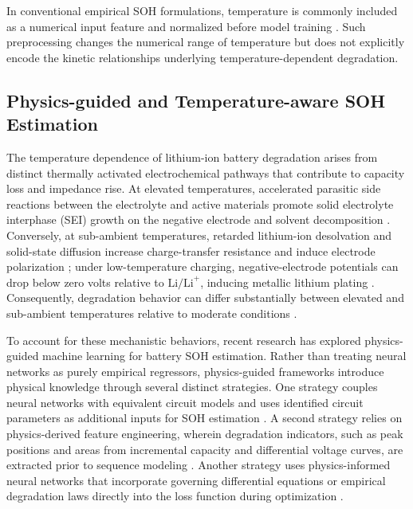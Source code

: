 \documentclass[a4paper,fleqn]{cas-sc}
\begin{document}
In conventional empirical SOH formulations, temperature is commonly included as a numerical input feature and normalized before model training \citep{sohtec2024,liu2025multi}. Such preprocessing changes the numerical range of temperature but does not explicitly encode the kinetic relationships underlying temperature-dependent degradation.

\subsection{Physics-guided and Temperature-aware SOH Estimation}\label{sec:rw-physics}
The temperature dependence of lithium-ion battery degradation arises from distinct thermally activated electrochemical pathways that contribute to capacity loss and impedance rise. At elevated temperatures, accelerated parasitic side reactions between the electrolyte and active materials promote solid electrolyte interphase (SEI) growth on the negative electrode and solvent decomposition \citep{gao2023effect}. Conversely, at sub-ambient temperatures, retarded lithium-ion desolvation and solid-state diffusion increase charge-transfer resistance and induce electrode polarization \citep{yang2018understanding}; under low-temperature charging, negative-electrode potentials can drop below zero volts relative to $\mathrm{Li/Li}^+$, inducing metallic lithium plating \citep{kumar2024}. Consequently, degradation behavior can differ substantially between elevated and sub-ambient temperatures relative to moderate conditions \citep{waldmann2014temperature}.

To account for these mechanistic behaviors, recent research has explored physics-guided machine learning for battery SOH estimation. Rather than treating neural networks as purely empirical regressors, physics-guided frameworks introduce physical knowledge through several distinct strategies. One strategy couples neural networks with equivalent circuit models and uses identified circuit parameters as additional inputs for SOH estimation \citep{chen2023state}. A second strategy relies on physics-derived feature engineering, wherein degradation indicators, such as peak positions and areas from incremental capacity and differential voltage curves, are extracted prior to sequence modeling \citep{pepe2023}. Another strategy uses physics-informed neural networks that incorporate governing differential equations or empirical degradation laws directly into the loss function during optimization \citep{chen2025pinn}.
\end{document}
